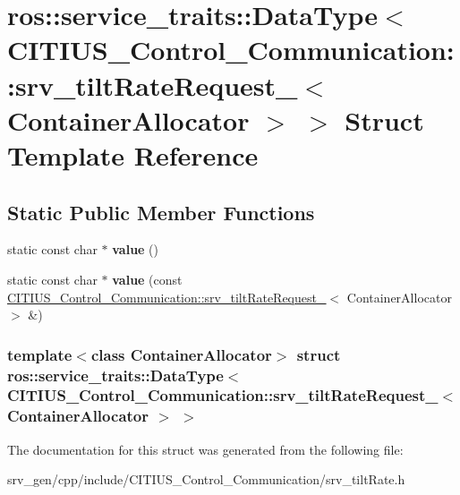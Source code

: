 \hypertarget{structros_1_1service__traits_1_1_data_type_3_01_c_i_t_i_u_s___control___communication_1_1srv__ti837e0d1ee3348ccf0285b47d3753bc30}{\section{ros\-:\-:service\-\_\-traits\-:\-:\-Data\-Type$<$ \-C\-I\-T\-I\-U\-S\-\_\-\-Control\-\_\-\-Communication\-:\-:srv\-\_\-tilt\-Rate\-Request\-\_\-$<$ \-Container\-Allocator $>$ $>$ \-Struct \-Template \-Reference}
\label{structros_1_1service__traits_1_1_data_type_3_01_c_i_t_i_u_s___control___communication_1_1srv__ti837e0d1ee3348ccf0285b47d3753bc30}
}
\subsection*{\-Static \-Public \-Member \-Functions}
\begin{DoxyCompactItemize}
\item 
\hypertarget{structros_1_1service__traits_1_1_data_type_3_01_c_i_t_i_u_s___control___communication_1_1srv__ti837e0d1ee3348ccf0285b47d3753bc30_a51ae5e444466ab79157ecc75c6b19a26}{static const char $\ast$ {\bfseries value} ()}\label{structros_1_1service__traits_1_1_data_type_3_01_c_i_t_i_u_s___control___communication_1_1srv__ti837e0d1ee3348ccf0285b47d3753bc30_a51ae5e444466ab79157ecc75c6b19a26}

\item 
\hypertarget{structros_1_1service__traits_1_1_data_type_3_01_c_i_t_i_u_s___control___communication_1_1srv__ti837e0d1ee3348ccf0285b47d3753bc30_a0d3d1048f2f96094c7be211d1a0150d7}{static const char $\ast$ {\bfseries value} (const \hyperlink{struct_c_i_t_i_u_s___control___communication_1_1srv__tilt_rate_request__}{\-C\-I\-T\-I\-U\-S\-\_\-\-Control\-\_\-\-Communication\-::srv\-\_\-tilt\-Rate\-Request\-\_\-}$<$ \-Container\-Allocator $>$ \&)}\label{structros_1_1service__traits_1_1_data_type_3_01_c_i_t_i_u_s___control___communication_1_1srv__ti837e0d1ee3348ccf0285b47d3753bc30_a0d3d1048f2f96094c7be211d1a0150d7}

\end{DoxyCompactItemize}
\subsubsection*{template$<$class Container\-Allocator$>$ struct ros\-::service\-\_\-traits\-::\-Data\-Type$<$ C\-I\-T\-I\-U\-S\-\_\-\-Control\-\_\-\-Communication\-::srv\-\_\-tilt\-Rate\-Request\-\_\-$<$ Container\-Allocator $>$ $>$}



\-The documentation for this struct was generated from the following file\-:\begin{DoxyCompactItemize}
\item 
srv\-\_\-gen/cpp/include/\-C\-I\-T\-I\-U\-S\-\_\-\-Control\-\_\-\-Communication/srv\-\_\-tilt\-Rate.\-h\end{DoxyCompactItemize}

